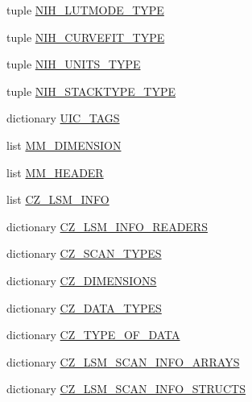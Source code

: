 \begin{DoxyCompactItemize}
\item 
tuple \hyperlink{namespacetifffile_a29b05f1c529c5abd896aec6cee9a1af3}{N\-I\-H\-\_\-\-L\-U\-T\-M\-O\-D\-E\-\_\-\-T\-Y\-P\-E}
\item 
tuple \hyperlink{namespacetifffile_af09e992d4e37ddf454d4df4e7670902b}{N\-I\-H\-\_\-\-C\-U\-R\-V\-E\-F\-I\-T\-\_\-\-T\-Y\-P\-E}
\item 
tuple \hyperlink{namespacetifffile_ae5e364e222f33b0da9bf47077e7e20da}{N\-I\-H\-\_\-\-U\-N\-I\-T\-S\-\_\-\-T\-Y\-P\-E}
\item 
tuple \hyperlink{namespacetifffile_a5c299b8313ca1b50275a0cdf769509ff}{N\-I\-H\-\_\-\-S\-T\-A\-C\-K\-T\-Y\-P\-E\-\_\-\-T\-Y\-P\-E}
\item 
dictionary \hyperlink{namespacetifffile_af89a61cc64a47325f08da391bce675d2}{U\-I\-C\-\_\-\-T\-A\-G\-S}
\item 
list \hyperlink{namespacetifffile_a073beeac6dac3b611fc1285512669e33}{M\-M\-\_\-\-D\-I\-M\-E\-N\-S\-I\-O\-N}
\item 
list \hyperlink{namespacetifffile_abbea883513007cc59d50161a9a0ee053}{M\-M\-\_\-\-H\-E\-A\-D\-E\-R}
\item 
list \hyperlink{namespacetifffile_a7b9a234cc0e12ba5cd6793933eb68f6a}{C\-Z\-\_\-\-L\-S\-M\-\_\-\-I\-N\-F\-O}
\item 
dictionary \hyperlink{namespacetifffile_a62f6bd5ddecc587462ec2c4665c1723d}{C\-Z\-\_\-\-L\-S\-M\-\_\-\-I\-N\-F\-O\-\_\-\-R\-E\-A\-D\-E\-R\-S}
\item 
dictionary \hyperlink{namespacetifffile_a729eeb5a29d1da4cf54f5ddf50e4a01e}{C\-Z\-\_\-\-S\-C\-A\-N\-\_\-\-T\-Y\-P\-E\-S}
\item 
dictionary \hyperlink{namespacetifffile_abad05e22bf2ebf7ab5ccedf0808acd55}{C\-Z\-\_\-\-D\-I\-M\-E\-N\-S\-I\-O\-N\-S}
\item 
dictionary \hyperlink{namespacetifffile_aa2835c5edb61189ec63980bca0e1ed72}{C\-Z\-\_\-\-D\-A\-T\-A\-\_\-\-T\-Y\-P\-E\-S}
\item 
dictionary \hyperlink{namespacetifffile_ac7e3e8843aae0f8ea8127281a91e7f31}{C\-Z\-\_\-\-T\-Y\-P\-E\-\_\-\-O\-F\-\_\-\-D\-A\-T\-A}
\item 
dictionary \hyperlink{namespacetifffile_a676ccf43128489b9cacc376508ba83c3}{C\-Z\-\_\-\-L\-S\-M\-\_\-\-S\-C\-A\-N\-\_\-\-I\-N\-F\-O\-\_\-\-A\-R\-R\-A\-Y\-S}
\item 
dictionary \hyperlink{namespacetifffile_a308da713564f561debbd4e6d07500659}{C\-Z\-\_\-\-L\-S\-M\-\_\-\-S\-C\-A\-N\-\_\-\-I\-N\-F\-O\-\_\-\-S\-T\-R\-U\-C\-T\-S}
\item 

\end{DoxyCompactItemize}
